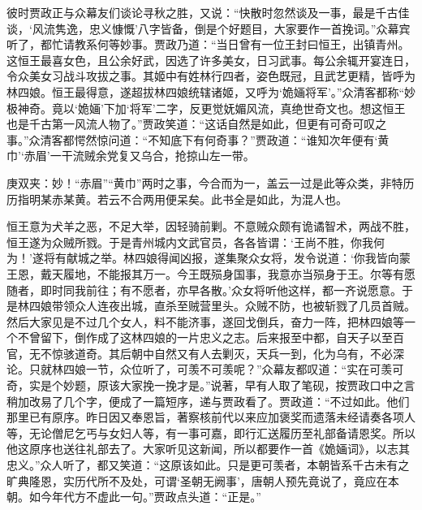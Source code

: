 \begin{parag}
    彼时贾政正与众幕友们谈论寻秋之胜，又说：“快散时忽然谈及一事，最是千古佳谈，‘风流隽逸，忠义慷慨’八字皆备，倒是个好题目，大家要作一首挽词。”众幕宾听了，都忙请教系何等妙事。贾政乃道：“当日曾有一位王封曰恒王，出镇青州。这恒王最喜女色，且公余好武，因选了许多美女，日习武事。每公余辄开宴连日，令众美女习战斗攻拔之事。其姬中有姓林行四者，姿色既冠，且武艺更精，皆呼为林四娘。恒王最得意，遂超拔林四娘统辖诸姬，又呼为‘姽婳将军’。”众清客都称“妙极神奇。竟以‘姽婳’下加‘将军’二字，反更觉妩媚风流，真绝世奇文也。想这恒王也是千古第一风流人物了。”贾政笑道：“这话自然是如此，但更有可奇可叹之事。”众清客都愕然惊问道：“不知底下有何奇事？”贾政道：“谁知次年便有‘黄巾’‘赤眉’一干流贼余党复又乌合，抢掠山左一带。\begin{note}庚双夹：妙！“赤眉”“黄巾”两时之事，今合而为一，盖云一过是此等众类，非特历历指明某赤某黄。若云不合两用便呆矣。此书全是如此，为混人也。\end{note}恒王意为犬羊之恶，不足大举，因轻骑前剿。不意贼众颇有诡谲智术，两战不胜，恒王遂为众贼所戮。于是青州城内文武官员，各各皆谓：‘王尚不胜，你我何为！’遂将有献城之举。林四娘得闻凶报，遂集聚众女将，发令说道：‘你我皆向蒙王恩，戴天履地，不能报其万一。今王既殒身国事，我意亦当殒身于王。尔等有愿随者，即时同我前往；有不愿者，亦早各散。’众女将听他这样，都一齐说愿意。于是林四娘带领众人连夜出城，直杀至贼营里头。众贼不防，也被斩戮了几员首贼。然后大家见是不过几个女人，料不能济事，遂回戈倒兵，奋力一阵，把林四娘等一个不曾留下，倒作成了这林四娘的一片忠义之志。后来报至中都，自天子以至百官，无不惊骇道奇。其后朝中自然又有人去剿灭，天兵一到，化为乌有，不必深论。只就林四娘一节，众位听了，可羡不可羡呢？”众幕友都叹道：“实在可羡可奇，实是个妙题，原该大家挽一挽才是。”说著，早有人取了笔砚，按贾政口中之言稍加改易了几个字，便成了一篇短序，递与贾政看了。贾政道：“不过如此。他们那里已有原序。昨日因又奉恩旨，著察核前代以来应加褒奖而遗落未经请奏各项人等，无论僧尼乞丐与女妇人等，有一事可嘉，即行汇送履历至礼部备请恩奖。所以他这原序也送往礼部去了。大家听见这新闻，所以都要作一首《姽婳词》，以志其忠义。”众人听了，都又笑道：“这原该如此。只是更可羡者，本朝皆系千古未有之旷典隆恩，实历代所不及处，可谓‘圣朝无阙事’，唐朝人预先竟说了，竟应在本朝。如今年代方不虚此一句。”贾政点头道：“正是。”
\end{parag}


